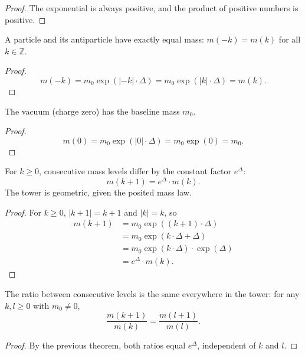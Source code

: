 \begin{proof}
The exponential is always positive, and the product of positive numbers is positive.
\end{proof}

\begin{theorem}
A particle and its antiparticle have exactly equal mass: $m(-k) = m(k)$ for all $k \in \mathbb{Z}$.
\end{theorem}

\begin{proof}
\[ m(-k) = m_0 \exp(|-k| \cdot \Delta) = m_0 \exp(|k| \cdot \Delta) = m(k). \]
\end{proof}

\begin{theorem}
The vacuum (charge zero) has the baseline mass $m_0$.
\end{theorem}

\begin{proof}
\[ m(0) = m_0 \exp(|0| \cdot \Delta) = m_0 \exp(0) = m_0. \]
\end{proof}

\begin{theorem}
For $k \geq 0$, consecutive mass levels differ by the constant factor $e^\Delta$:
\[ m(k+1) = e^\Delta \cdot m(k). \]
The tower is geometric, given the posited mass law.
\end{theorem}

\begin{proof}
For $k \geq 0$, $|k+1| = k+1$ and $|k| = k$, so
\begin{align}
m(k+1) &= m_0 \exp((k+1) \cdot \Delta)\\
&= m_0 \exp(k \cdot \Delta + \Delta)\\
&= m_0 \exp(k \cdot \Delta) \cdot \exp(\Delta)\\
&= e^\Delta \cdot m(k).
\end{align}
\end{proof}

\begin{theorem}
The ratio between consecutive levels is the same everywhere in the tower: for any $k, l \geq 0$ with $m_0 \neq 0$,
\[ \frac{m(k+1)}{m(k)} = \frac{m(l+1)}{m(l)}. \]
\end{theorem}

\begin{proof}
By the previous theorem, both ratios equal $e^\Delta$, independent of $k$ and $l$.
\end{proof}

